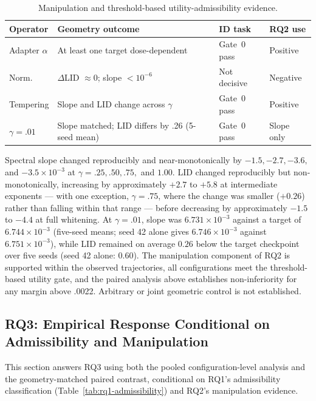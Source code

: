\documentclass[pdflatex,sn-basic]{sn-jnl}
\theoremstyle{plain}
\theoremstyle{definition}
\theoremstyle{remark}
\begin{document}
\begin{table}[t]
\centering
\caption{Manipulation and threshold-based utility-admissibility evidence.}
\label{tab:rq2-manipulation}
\small
\begin{tabular}{p{2.2cm}p{6.0cm}p{3.0cm}p{2.2cm}}
\toprule
Operator & Geometry outcome & ID task & RQ2 use\\
\midrule
Adapter $\alpha$ & At least one target dose-dependent & Gate~0 pass & Positive\\
Norm. & $\Delta$LID $\approx0$; slope $<10^{-6}$ & Not decisive & Negative\\
Tempering & Slope and LID change across $\gamma$ & Gate~0 pass & Positive\\
$\gamma=.01$ & Slope matched; LID differs by .26 (5-seed mean) & Gate~0 pass & Slope only\\
\bottomrule
\end{tabular}
\end{table}

Spectral slope changed reproducibly and near-monotonically by $-1.5,-2.7,-3.6,$ and $-3.5\times10^{-3}$ at $\gamma=.25,.50,.75,$ and $1.00$. LID changed reproducibly but non-monotonically, increasing by approximately $+2.7$ to $+5.8$ at intermediate exponents --- with one exception, $\gamma=.75$, where the change was smaller ($+0.26$) rather than falling within that range --- before decreasing by approximately $-1.5$ to $-4.4$ at full whitening. At $\gamma=.01$, slope was $6.731\times10^{-3}$ against a target of $6.744\times10^{-3}$ (five-seed means; seed 42 alone gives $6.746\times10^{-3}$ against $6.751\times10^{-3}$), while LID remained on average $0.26$ below the target checkpoint over five seeds (seed 42 alone: $0.60$). The manipulation component of RQ2 is supported within the observed trajectories, all configurations meet the threshold-based utility gate, and the paired analysis above establishes non-inferiority for any margin above .0022. Arbitrary or joint geometric control is not established.

\subsection{RQ3: Empirical Response Conditional on Admissibility and Manipulation}
This section answers RQ3 using both the pooled configuration-level analysis and the geometry-matched paired contrast, conditional on RQ1's admissibility classification (Table~\ref{tab:rq1-admissibility}) and RQ2's manipulation evidence.
\end{document}
